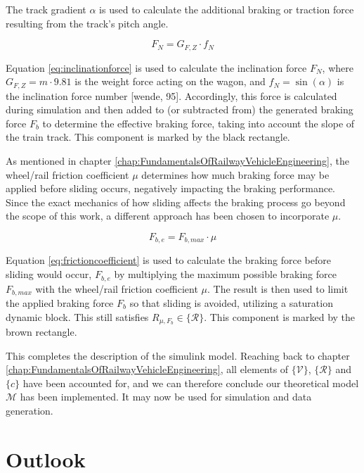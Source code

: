 \par
The track gradient $\alpha$ is used to calculate the additional braking or traction force resulting from the track's pitch angle. 

\begin{equation}
\label{eq:inclinationforce}
F_{N} = G_{F,Z} \cdot f_{N}
\end{equation}

\noindent
Equation \ref{eq:inclinationforce} is used to calculate the inclination force $F_{N}$, where $G_{F,Z} = m \cdot 9.81$ is the weight force acting on the wagon, and $f_{N} = \sin(\alpha)$ is the inclination force number [wende, 95]. Accordingly, this force is calculated during simulation and then added to (or subtracted from) the generated braking force $F_{b}$ to determine the effective braking force, taking into account the slope of the train track. This component is marked by the black rectangle.
\par
As mentioned in chapter \ref{chap:FundamentalsOfRailwayVehicleEngineering}, the wheel/rail friction coefficient $\mu$ determines how much braking force may be applied before sliding occurs, negatively impacting the braking performance. Since the exact mechanics of how sliding affects the braking process go beyond the scope of this work, a different approach has been chosen to incorporate $\mu$.

\begin{equation}
\label{eq:frictioncoefficient}
F_{b,e} = F_{b,max} \cdot \mu
\end{equation}

\noindent
Equation \ref{eq:frictioncoefficient} is used to calculate the braking force before sliding would occur, $F_{b,e}$ by multiplying the maximum possible braking force $F_{b,max}$ with the wheel/rail friction coefficient $\mu$. The result is then used to limit the applied braking force $F_{b}$ so that sliding is avoided, utilizing a saturation dynamic block. This still satisfies $R_{\mu,F_{b}} \in \{ {\mathcal{R}} \}$. This component is marked by the brown rectangle.
\bigskip
\par\noindent
This completes the description of the simulink model. Reaching back to chapter \ref{chap:FundamentalsOfRailwayVehicleEngineering}, all elements of $\{ {\mathcal{V}} \}$, $\{ {\mathcal{R}} \}$ and $\{ c \}$ have been accounted for, and we can therefore conclude our theoretical model ${\mathcal{M}}$ has been implemented. It may now be used for simulation and data generation.

\section{Outlook}
\label{sec:Outlook}

